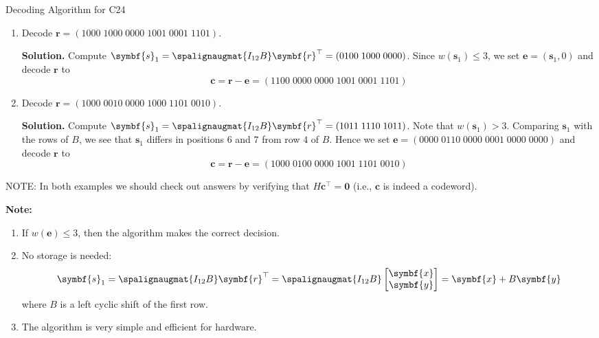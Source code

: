\begin{Example}{Decoding Algorithm for C24}{}
    \begin{enumerate}
        \item Decode $ \symbf{r}=(1000\; 1000\; 0000\; 1001\; 0001\; 1101) $.

              \textbf{Solution.} Compute $ \symbf{s}_1=\spalignaugmat{I_{12} B}\symbf{r}^\top=
                  (0100\; 1000\; 0000) $. Since $ w(\symbf{s}_1)\leqslant 3 $, we set
              $ \symbf{e}=(\symbf{s}_1,0) $ and decode $ \symbf{r} $ to
              \[ \symbf{c}=\symbf{r}-\symbf{e}=(1100\; 0000\; 0000\; 1001\; 0001\; 1101) \]

        \item Decode $ \symbf{r}=(1000\; 0010\; 0000\; 1000\; 1101\; 0010) $.

              \textbf{Solution.} Compute $ \symbf{s}_1=\spalignaugmat{I_{12} B}\symbf{r}^\top=
                  (1011\; 1110\; 1011) $. Note that $ w(\symbf{s}_1)>3 $. Comparing $ \symbf{s}_1 $
              with the rows of $ B $, we see that $ \symbf{s}_1 $ differs in positions $ 6 $
              and $ 7 $ from row $ 4 $ of $ B $. Hence we set $ \symbf{e}=(0000\; 0110\; 0000\; 0001\; 0000\; 0000) $
              and decode $ \symbf{r} $ to
              \[ \symbf{c}=\symbf{r}-\symbf{e}=(1000\; 0100\; 0000\; 1001\; 1101\; 0010) \]
    \end{enumerate}

    NOTE\@: In both examples we should check out answers by verifying that $ H\symbf{c}^\top=\symbf{0} $
    (i.e., $ \symbf{c} $ is indeed a codeword).
\end{Example}


\textbf{Note:}
\begin{enumerate}[label=(\arabic*)]
    \item If $ w(\symbf{e})\leqslant 3 $, then the algorithm makes the correct decision.
    \item No storage is needed:
          \[ \symbf{s}_1=\spalignaugmat{I_{12} B}\symbf{r}^\top=\spalignaugmat{I_{12} B}
              \begin{bmatrix}
                  \symbf{x} \\
                  \symbf{y}
              \end{bmatrix}=\symbf{x}+B\symbf{y} \]
          where $ B $ is a left cyclic shift of the first row.
    \item The algorithm is very simple and efficient for hardware.
\end{enumerate}

